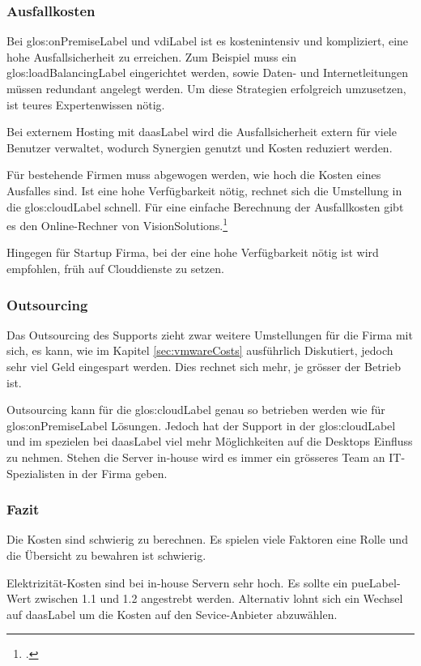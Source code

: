 \subsubsection{Ausfallkosten}
Bei \gls{glos:onPremiseLabel} und \Gls{vdiLabel} ist es kostenintensiv und kompliziert, eine hohe Ausfallsicherheit zu erreichen. Zum Beispiel muss ein \gls{glos:loadBalancingLabel} eingerichtet werden, sowie Daten- und Internetleitungen müssen redundant angelegt werden. Um diese Strategien erfolgreich umzusetzen, ist teures Expertenwissen nötig.

Bei externem Hosting mit \Gls{daasLabel} wird die Ausfallsicherheit extern für viele Benutzer verwaltet, wodurch Synergien genutzt und Kosten reduziert werden.

Für bestehende Firmen muss abgewogen werden, wie hoch die Kosten eines Ausfalles sind. Ist eine hohe Verfügbarkeit nötig, rechnet sich die Umstellung in die \Gls{glos:cloudLabel} schnell. Für eine einfache Berechnung der Ausfallkosten gibt es den Online-Rechner von VisionSolutions.\footcite{Disaster_Recovery_Resouce_Center_-_Vision_Solutions}

Hingegen für Startup Firma, bei der eine hohe Verfügbarkeit nötig ist wird empfohlen, früh auf Clouddienste zu setzen.

\subsubsection{Outsourcing}
Das Outsourcing des Supports zieht zwar weitere Umstellungen für die Firma mit sich, es kann, wie im Kapitel \cref{sec:vmwareCosts} ausführlich Diskutiert, jedoch sehr viel Geld eingespart werden. Dies rechnet sich mehr, je grösser der Betrieb ist.

Outsourcing kann für die \Gls{glos:cloudLabel} genau so betrieben werden wie für \gls{glos:onPremiseLabel} Lösungen. Jedoch hat der Support in der \Gls{glos:cloudLabel} und im spezielen bei \Gls{daasLabel} viel mehr Möglichkeiten auf die Desktops Einfluss zu nehmen. Stehen die Server in-house wird es immer ein grösseres Team an IT-Spezialisten in der Firma geben.

\subsubsection{Fazit}
Die Kosten sind schwierig zu berechnen. Es spielen viele Faktoren eine Rolle und die Übersicht zu bewahren ist schwierig.

Elektrizität-Kosten sind bei in-house Servern sehr hoch. Es sollte ein \Gls{pueLabel}-Wert zwischen 1.1 und 1.2 angestrebt werden. Alternativ lohnt sich ein Wechsel auf \Gls{daasLabel} um die Kosten auf den Sevice-Anbieter abzuwählen.

